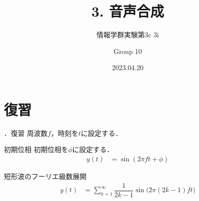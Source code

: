 \documentclass[aspectratio=43]{beamer}
\title{3. 音声合成}
\subtitle{情報学群実験第3c 3i}
\author{Group 10}
\date{2023.04.20}
\newcommand{\showsec}{\thesection ．}
\begin{document}
\begin{frame}
    \titlepage
\end{frame}
\begin{frame}
    \tableofcontents
\end{frame}
\section{復習}
\begin{frame}[t]{\showsec 復習}
    周波数\(f\)，時刻を\(t\)に設定する．
    \begin{block}{初期位相}
        初期位相を\(\phi\)に設定する．
        \begin{align}
            y(t) & = \sin(2\pi ft+\phi)
        \end{align}
    \end{block}
    \begin{block}{短形波のフーリエ級数展開}
        \begin{align}
            y(t) & = \sum_{k=1}^{\infty}\dfrac{1}{2k-1}\sin\big(2\pi(2k-1)ft\big)
        \end{align}
    \end{block}
\end{frame}
\end{document}
